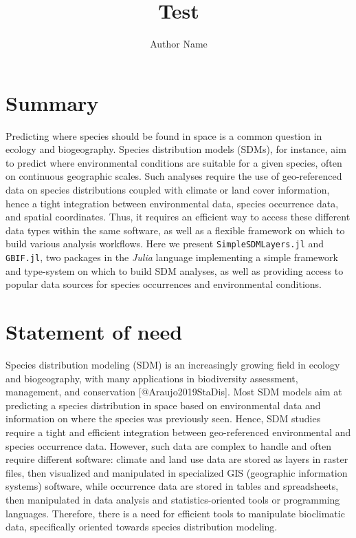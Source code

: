 \documentclass[
]{article}
\title{Test}
\author{Author Name}
\date{}
\begin{document}
\maketitle

\hypertarget{summary}{%
\section{Summary}\label{summary}}

Predicting where species should be found in space is a common question
in ecology and biogeography. Species distribution models (SDMs), for
instance, aim to predict where environmental conditions are suitable for
a given species, often on continuous geographic scales. Such analyses
require the use of geo-referenced data on species distributions coupled
with climate or land cover information, hence a tight integration
between environmental data, species occurrence data, and spatial
coordinates. Thus, it requires an efficient way to access these
different data types within the same software, as well as a flexible
framework on which to build various analysis workflows. Here we present
\texttt{SimpleSDMLayers.jl} and
\texttt{GBIF.jl}, two packages in the \emph{Julia} language
implementing a simple framework and type-system on which to build SDM
analyses, as well as providing access to popular data sources for
species occurrences and environmental conditions.

\hypertarget{statement-of-need}{%
\section{Statement of need}\label{statement-of-need}}

Species distribution modeling (SDM) is an increasingly growing field in
ecology and biogeography, with many applications in biodiversity
assessment, management, and conservation {[}@Araujo2019StaDis{]}. Most
SDM models aim at predicting a species distribution in space based on
environmental data and information on where the species was previously
seen. Hence, SDM studies require a tight and efficient integration
between geo-referenced environmental and species occurrence data.
However, such data are complex to handle and often require different
software: climate and land use data are stored as layers in raster
files, then visualized and manipulated in specialized GIS (geographic
information systems) software, while occurrence data are stored in
tables and spreadsheets, then manipulated in data analysis and
statistics-oriented tools or programming languages. Therefore, there is
a need for efficient tools to manipulate bioclimatic data, specifically
oriented towards species distribution modeling.
\end{document}

